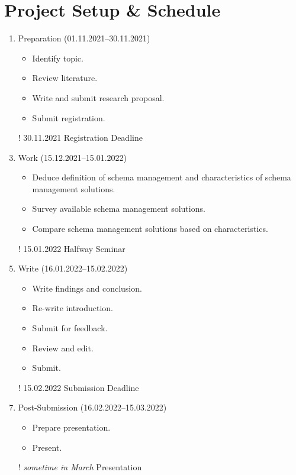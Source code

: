 
\section{Project Setup \& Schedule}\label{sec:project-setup}

\begin{enumerate}
  \item Preparation (01.11.2021--30.11.2021)
  \begin{itemize}
    \item Identify topic.
    \item Review literature.
    \item Write and submit research proposal.
    \item Submit registration.
  \end{itemize}
  \item[!] 30.11.2021 Registration Deadline
  \item Work (15.12.2021--15.01.2022)
  \begin{itemize}
    \item Deduce definition of schema management and characteristics of schema management solutions.
    \item Survey available schema management solutions.
    \item Compare schema management solutions based on characteristics.
  \end{itemize}
  \item[!] 15.01.2022 Halfway Seminar
  \item Write (16.01.2022--15.02.2022)
  \begin{itemize}
    \item Write findings and conclusion.
    \item Re-write introduction.
    \item Submit for feedback.
    \item Review and edit.
    \item Submit.
  \end{itemize}
  \item[!] 15.02.2022 Submission Deadline
  \item Post-Submission (16.02.2022--15.03.2022)
  \begin{itemize}
    \item Prepare presentation.
    \item Present.
  \end{itemize}
  \item[!] \emph{sometime in March} Presentation
\end{enumerate}
